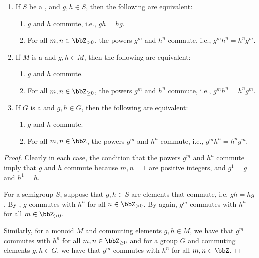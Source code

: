 \begin{lemma} \label{lemma:powers_of_elements_in_a_semigroup_monoid_group_commute_if_and_only_if_the_elements_commute}
    \begin{enumerate}
        \item If $S$ be a , and $g, h \in S$, then the following are equivalent:
        \begin{enumerate}
            \item $g$ and $h$ commute, i.e., $gh = hg$.
            \item For all $m, n \in \bbZ_{>0}$, the powers $g^m$ and $h^n$ commute, i.e., $g^m h^n = h^n g^m$.
        \end{enumerate}

        \item If $M$ is a  and $g, h \in M$, then the following are equivalent:
        \begin{enumerate}
            \item $g$ and $h$ commute.
            \item For all $m, n \in \bbZ_{\ge 0}$, the powers $g^m$ and $h^n$ commute, i.e., $g^m h^n = h^n g^m$.
        \end{enumerate}

        \item If $G$ is a  and $g, h \in G$, then the following are equivalent:
        \begin{enumerate}
            \item $g$ and $h$ commute.
            \item For all $m, n \in \bbZ$, the powers $g^m$ and $h^n$ commute, i.e., $g^m h^n = h^n g^m$.
        \end{enumerate}
    \end{enumerate}
\end{lemma}

\begin{proof}
    Clearly in each case, the condition that the powers $g^m$ and $h^n$ commute imply that $g$ and $h$ commute because $m,n = 1$ are positive integers, and $g^1 = g$ and $h^1 = h$. 

    For a semigroup $S$, suppose that $g,h \in S$ are elements that commute, i.e. $gh = hg$. By , $g$ commutes with $h^n$ for all $n \in \bbZ_{>0}$. By  again, $g^m$ commutes with $h^n$ for all $m \in \bbZ_{>0}$.

    Similarly, for a monoid $M$ and commuting elements $g,h \in M$, we have that $g^m$ commutes with $h^n$ for all $m,n \in \bbZ_{\geq 0}$ and for a group $G$ and commuting elements $g,h \in G$, we have that $g^m$ commutes with $h^n$ for all $m,n \in \bbZ$.
\end{proof}